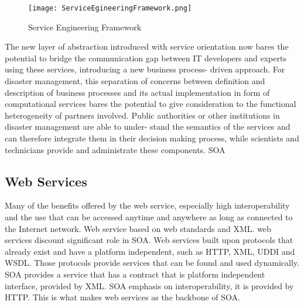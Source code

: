 \begin{figure}[H]
\centering
\texttt{[image: ServiceEgineeringFramework.png]}
	\caption{Service Engineering Framework}
	\label{fig:SEFramework}
\end{figure}

The new layer of abstraction introduced with service orientation now bares the potential to bridge the communication gap between IT developers and experts using these services, introducing a new business process- driven approach. For disaster management, this separation of concerns between definition and description of business processes and its actual implementation in form of computational services bares the potential to give consideration to the functional heterogeneity of partners involved. Public authorities or other institutions in disaster management are able to under- stand the semantics of the services and can therefore integrate them in their decision making process, while scientists and technicians provide and administrate these components.
SOA\par 

\subsection{Web Services}
Many of the benefits offered by the web service, especially high interoperability and the use that can be accessed anytime and anywhere as long as connected to the Internet network. Web service based on web standards and XML. web services discount significant role in SOA. Web services built upon protocols that already exist and have a platform independent, such as HTTP, XML, UDDI and WSDL. Those protocols provide services that can be found and used dynamically. SOA provides a service that has a contract that is platform independent interface, provided by XML. SOA emphasis on interoperability, it is provided by HTTP. This is what makes web services as the backbone of SOA.\par

